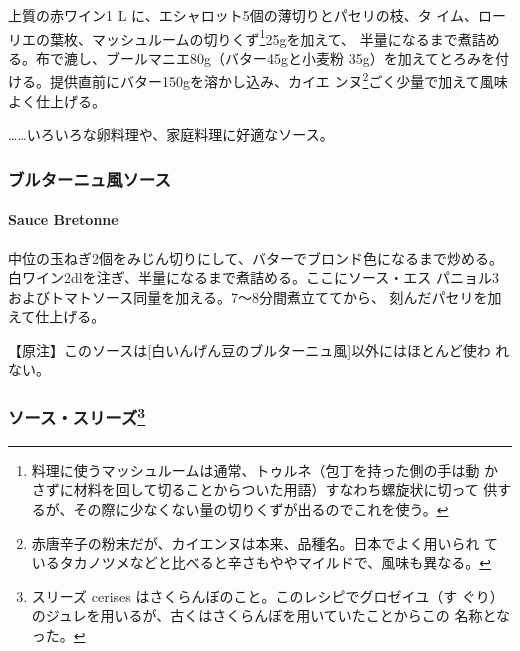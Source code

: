  

上質の赤ワイン1\undemi{} L に、エシャロット5個の薄切りとパセリの枝、タ
イム、ローリエの葉\undemi{}枚、マッシュルームの切りくず\footnote{料理に使うマッシュルームは通常、トゥルネ（包丁を持った側の手は動
  かさずに材料を回して切ることからついた用語）すなわち螺旋状に切って
  供するが、その際に少なくない量の切りくずが出るのでこれを使う。}25gを加えて、
半量になるまで煮詰める。布で漉し、ブールマニエ80g（バター45gと小麦粉
35g）を加えてとろみを付ける。提供直前にバター150gを溶かし込み、カイエ
ンヌ\footnote{赤唐辛子の粉末だが、カイエンヌは本来、品種名。日本でよく用いられ
  ているタカノツメなどと比べると辛さもややマイルドで、風味も異なる。}ごく少量で加えて風味よく仕上げる。

\ldots{}\ldots{}いろいろな卵料理や、家庭料理に好適なソース。

\maeaki

\hypertarget{ux30d6ux30ebux30bfux30fcux30cbux30e5ux98a8ux30bdux30fcux30b9}{%
\subsubsection{ブルターニュ風ソース}\label{ux30d6ux30ebux30bfux30fcux30cbux30e5ux98a8ux30bdux30fcux30b9}}

\hypertarget{sauce-bretonne}{%
\paragraph{Sauce Bretonne}\label{sauce-bretonne}}


中位の玉ねぎ2個をみじん切りにして、バターでブロンド色になるまで炒める。
白ワイン2\undemi{}dlを注ぎ、半量になるまで煮詰める。ここにソース・エス
パニョル3\undemi{}およびトマトソース同量を加える。7〜8分間煮立ててから、
刻んだパセリを加えて仕上げる。

【原注】このソースは{[}白いんげん豆のブルターニュ風{]}以外にはほとんど使わ
れない。

\maeaki

\hypertarget{ux30bdux30fcux30b9ux30b9ux30eaux30fcux30ba6}{%
\subsubsection[ソース・スリーズ]{\texorpdfstring{ソース・スリーズ\footnote{スリーズ
  cerises はさくらんぼのこと。このレシピでグロゼイユ（す
  ぐり）のジュレを用いるが、古くはさくらんぼを用いていたことからこの
  名称となった。}}{ソース・スリーズ}}\label{ux30bdux30fcux30b9ux30b9ux30eaux30fcux30ba6}}

